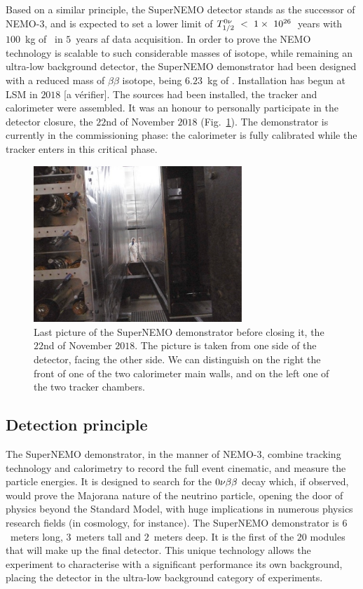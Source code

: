 Based on a similar principle, the SuperNEMO detector stands as the successor of NEMO-$3$, and is expected to set a lower limit of $T_{1/2}^{0\nu}~<~1\times~10^{26}$~years with $100$~kg of \Se\ in $5$~years af data acquisition.
In order to prove the NEMO technology is scalable to such considerable masses of isotope, while remaining an ultra-low background detector, the SuperNEMO demonstrator had been designed with a reduced mass of $\beta\beta$ isotope, being $6.23$~kg of \Se.
Installation has begun at LSM in $2018$ [a vérifier].
The sources had been installed, the tracker and calorimeter were assembled.
It was an honour to personally participate in the detector closure, the $22$nd of November $2018$ (Fig.~\ref{fig:detector_closing}).
The demonstrator is currently in the commissioning phase: the calorimeter is fully calibrated while the tracker enters in this critical phase.
\begin{figure}[h!]
\centering
\includegraphics[width=0.7\textwidth]{SNdemonstrator/fig_SNdemonstrator/detector_closing.pdf}
\caption{Last picture of the SuperNEMO demonstrator before closing it, the $22$nd of November $2018$.
  The picture is taken from one side of the detector, facing the other side.
  We can distinguish on the right the front of one of the two calorimeter main walls, and on the left one of the two tracker chambers.
\label{fig:detector_closing}}
\end{figure}

\subsection{Detection principle}


The SuperNEMO demonstrator, in the manner of NEMO-$3$, combine tracking technology and calorimetry to record the full event cinematic, and measure the particle energies.
It is designed to search for the $0\nu\beta\beta$ decay which, if observed, would prove the Majorana nature of the neutrino particle, opening the door of physics beyond the Standard Model, with huge implications in numerous physics research fields (in cosmology, for instance).
The SuperNEMO demonstrator is $6$~meters long, $3$~meters tall and $2$~meters deep.
It is the first of the $20$ modules that will make up the final detector.
This unique technology allows the experiment to characterise with a significant performance its own background, placing the detector in the ultra-low background category of experiments.

